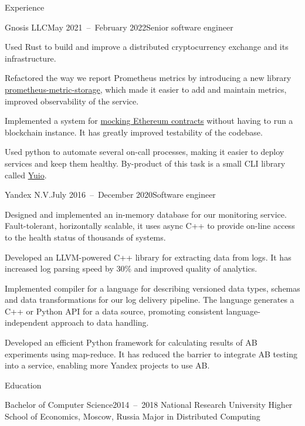 \documentclass{resume}
\begin{document}
    \begin{rSection}{Experience}
        \begin{rSubsection}{Gnosis LLC}{May 2021~--~February 2022}{Senior software engineer}{}
            \item
                Used Rust to build and improve
                a distributed cryptocurrency exchange and its infrastructure.
            \item
                Refactored the way we report Prometheus metrics
                by introducing a new library
                \href{https://github.com/taminomara/prometheus-metric-storage}{prometheus-metric-storage}, which made it easier to add and maintain metrics,
                improved observability of the service.
            \item
                Implemented a system for
                \href{https://docs.rs/ethcontract-mock/latest/ethcontract_mock/}{mocking Ethereum contracts}
                without having to run a blockchain instance.
                It has greatly improved testability of the codebase.
            \item
                Used python to automate several on-call processes,
                making it easier to deploy services and keep them healthy.
                By-product of this task is a small CLI library called
                \href{https://github.com/taminomara/yuio}{Yuio}.
        \end{rSubsection}

        \begin{rSubsection}{Yandex N.V.}{July 2016~--~December 2020}{Software engineer}{}
            \item
                Designed and implemented an in-memory database
                for our monitoring service.
                Fault-tolerant, horizontally scalable,
                it uses async C++ to provide on-line access
                to the health status of thousands of systems.
            \item
                Developed an LLVM-powered C++ library
                for extracting data from logs.
                It has increased log parsing speed
                by 30\% and improved quality of analytics.
            \item
                Implemented compiler for a language for describing
                versioned data types, schemas and data transformations
                for our log delivery pipeline. The language
                generates a C++ or Python API for a data source,
                promoting consistent language-independent approach to data handling.
            \item
                Developed an efficient Python framework
                for calculating results of AB experiments using map-reduce.
                It has reduced the barrier
                to integrate AB testing into a service,
                enabling more Yandex projects to use AB\@.
        \end{rSubsection}
    \end{rSection}

    \begin{rSection}{Education}
        \begin{rSubsection}{Bachelor of Computer Science}{2014~--~2018}
        {National Research University Higher School of Economics, Moscow, Russia}{}
            Major in Distributed Computing
        \end{rSubsection}
    \end{rSection}
\end{document}
